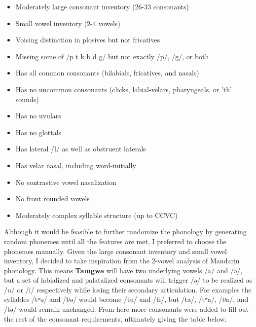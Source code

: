 \documentclass[a4paper,12pt,twoside,openright]{memoir}
\begin{document}
\begin{itemize}
    \item Moderately large consonant inventory (26-33 consonants)
    \item Small vowel inventory (2-4 vowels)
    \item Voicing distinction in plosives but not fricatives
    \item Missing some of /p t k b d g/ but not exactly /p/, /g/, or both
    \item Has all common consonants (bilabials, fricatives, and nasals)
    \item Has no uncommon consonants (clicks, labial-velars, pharyngeals, or 'th' sounds)
    \item Has no uvulars
    \item Has no glottals
    \item Has lateral /l/ as well as obstruent laterals
    \item Has velar nasal, including word-initially
    \item No contrastive vowel nasalization
    \item No front rounded vowels
    \item Moderately complex syllable structure (up to CCVC)
\end{itemize}

    Although it would be feasible to further randomize the phonology by generating random phonemes until all the features are met, I preferred to choose the phonemes manually.  Given the large consonant inventory and small vowel inventory, I decided to take inspiration from the 2-vowel analysis of Mandarin phonology.  This means \textbf{Tamgwa} will have two underlying vowels /a/ and /ə/, but a set of labialized and palatalized consonants will trigger /ə/ to be realized as /u/ or /i/ respectively while losing their secondary articulation.  For examples the syllables /tʷə/ and /tʲə/ would become /tu/ and /ti/, but /ta/, /tʷa/, /tʲa/, and /tə/ would remain unchanged.  From here more consonants were added to fill out the rest of the consonant requirements, ultimately giving the table below.
\end{document}
